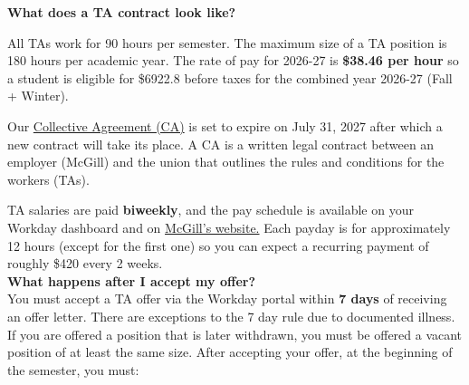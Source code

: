 \noindent \textbf{\sffamily What does a TA contract look like?} 
\begin{plainexercise}
  All TAs work for 90 hours per semester. The maximum size of a TA position is 180 hours per academic year. The rate of pay for 2026-27 is \textbf{\$38.46 per hour} so a student is eligible for \$6922.8 before taxes for the combined year 2026-27 (Fall + Winter).   
\end{plainexercise}
Our \href{https://tsum-stsem.ca/documents/Simplified%20CA%20August%202024.pdf}{Collective Agreement (CA)} is set to expire on July 31, 2027 after which a new contract will take its place. A CA is a written legal contract between an employer (McGill) and the union that outlines the rules and conditions for the workers (TAs). 

TA salaries are paid \textbf{biweekly}, and the pay schedule is available on your Workday dashboard and on \href{https://www.mcgill.ca/hr/files/hr/2026_salaried_pay_calendar.pdf}{McGill's website.} Each payday is for approximately 12 hours (except for the first one) so you can expect a recurring payment of roughly \$420 every 2 weeks. \\

\noindent \textbf{\sffamily What happens after I accept my offer?} \\
You must accept a TA offer via the Workday portal within \textbf{7 days} of receiving an
offer letter. There are exceptions to the 7 day rule due to documented
illness. If you are offered a position that is later withdrawn, you must be offered a vacant position of at least the same size. After accepting your offer, at the beginning of the semester, you must: 

